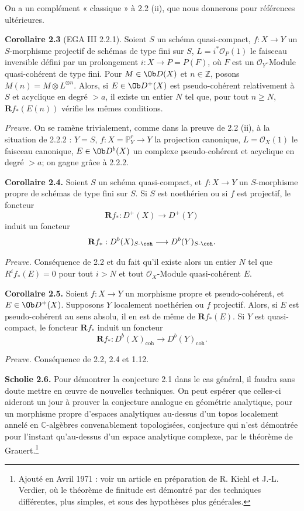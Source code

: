 \documentclass[11pt]{article}
\begin{document}
On a un complément « classique » à 2.2 (ii), que nous donnerons pour références ultérieures.

\textbf{Corollaire 2.3} (EGA III 2.2.1). Soient \(S\) un schéma quasi-compact, \(f:X\to Y\) un \(S\)-morphisme projectif de schémas de type fini sur \(S\), \(L=i^*\mathcal O_P(1)\) le faisceau inversible défini par un prolongement \(i:X\to P=P(F)\), où \(F\) est un \(\mathcal O_Y\)-Module quasi-cohérent de type fini. Pour \(M\in\Ob D(X)\) et \(n\in\mathbb Z\), posons \(M(n)=M\otimes L^{\otimes n}\). Alors, si \(E\in\Ob D^+(X)\) est pseudo-cohérent relativement à \(S\) et acyclique en degré \(>a\), il existe un entier \(N\) tel que, pour tout \(n\geq N\), \(\mathbf Rf_*(E(n))\) vérifie les mêmes conditions.

\emph{Preuve.} On se ramène trivialement, comme dans la preuve de 2.2 (ii), à la situation de 2.2.2 : \(Y=S\), \(f:X=\mathbb P^r_Y\to Y\) la projection canonique, \(L=\mathcal O_X(1)\) le faisceau canonique, \(E\in\Ob D^b(X)\) un complexe pseudo-cohérent et acyclique en degré \(>a\); on gagne grâce à 2.2.2.

\textbf{Corollaire 2.4.} Soient \(S\) un schéma quasi-compact, et \(f:X\to Y\) un \(S\)-morphisme propre de schémas de type fini sur \(S\). Si \(S\) est noethérien ou si \(f\) est projectif, le foncteur
\[
  \mathbf Rf_*:D^+(X)\longrightarrow D^+(Y)
\]
induit un foncteur
\[
  \mathbf Rf_*:D^b(X)_{S\text{-}\coh}\longrightarrow D^b(Y)_{S\text{-}\coh}.
\]

\emph{Preuve.} Conséquence de 2.2 et du fait qu'il existe alors un entier \(N\) tel que \(R^if_*(E)=0\) pour tout \(i>N\) et tout \(\mathcal O_X\)-Module quasi-cohérent \(E\).

\textbf{Corollaire 2.5.} Soient \(f:X\to Y\) un morphisme propre et pseudo-cohérent, et \(E\in\Ob D^+(X)\). Supposons \(Y\) localement noethérien ou \(f\) projectif. Alors, si \(E\) est pseudo-cohérent au sens absolu, il en est de même de \(\mathbf Rf_*(E)\). Si \(Y\) est quasi-compact, le foncteur \(\mathbf Rf_*\) induit un foncteur
\[
  \mathbf Rf_*:D^b(X)_{\mathrm{coh}}\longrightarrow D^b(Y)_{\mathrm{coh}}.
\]

\emph{Preuve.} Conséquence de 2.2, 2.4 et 1.12.

\textbf{Scholie 2.6.} Pour démontrer la conjecture 2.1 dans le cas général, il faudra sans doute mettre en œuvre de nouvelles techniques. On peut espérer que celles-ci aideront un jour à prouver la conjecture analogue en géométrie analytique, pour un morphisme propre d'espaces analytiques au-dessus d'un topos localement annelé en \(\mathbb C\)-algèbres convenablement topologisées, conjecture qui n'est démontrée pour l'instant qu'au-dessus d'un espace analytique complexe, par le théorème de Grauert.\footnote{Ajouté en Avril 1971 : voir un article en préparation de R. Kiehl et J.-L. Verdier, où le théorème de finitude est démontré par des techniques différentes, plus simples, et sous des hypothèses plus générales.}
\end{document}
